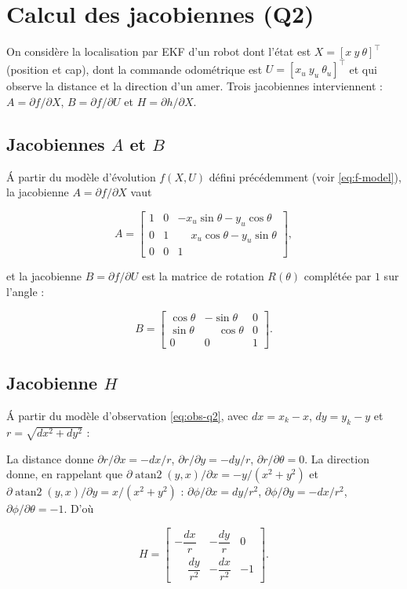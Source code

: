 \documentclass[11pt]{article}
\theoremstyle{remark}
\theoremstyle{definition}
\begin{document}
\section{Calcul des jacobiennes (Q2)}\label{sec:jacobiennes}

On consid\`ere la localisation par EKF d'un robot dont l'\'etat est
$X = [x\ y\ \theta]^\top$ (position et cap), dont la commande odom\'etrique est
$U = [x_u\ y_u\ \theta_u]^\top$ et qui observe la distance et la direction d'un amer. Trois
jacobiennes interviennent : $A = \partial f/\partial X$, $B = \partial f/\partial U$ et
$H = \partial h/\partial X$.

\subsection{Jacobiennes $A$ et $B$}

\'A partir du mod\`ele d'\'evolution $f(X,U)$ d\'efini pr\'ec\'edemment (voir
\eqref{eq:f-model}), la jacobienne $A = \partial f/\partial X$ vaut

\begin{equation}
A =
\begin{bmatrix}
1 & 0 & -x_u\sin\theta - y_u\cos\theta \\[2pt]
0 & 1 & \phantom{-}x_u\cos\theta - y_u\sin\theta \\[2pt]
0 & 0 & 1
\end{bmatrix},
\label{eq:A}
\end{equation}

et la jacobienne $B = \partial f/\partial U$ est la matrice de rotation $R(\theta)$ compl\'et\'ee
par $1$ sur l'angle :

\begin{equation}
B =
\begin{bmatrix}
\cos\theta & -\sin\theta & 0 \\[2pt]
\sin\theta & \phantom{-}\cos\theta & 0 \\[2pt]
0 & 0 & 1
\end{bmatrix}.
\label{eq:B}
\end{equation}

\subsection{Jacobienne $H$}

\'A partir du mod\`ele d'observation \eqref{eq:obs-q2}, avec $dx = x_k - x$, $dy = y_k - y$ et
$r = \sqrt{dx^2 + dy^2}$ :

La distance donne $\partial r/\partial x = -dx/r$, $\partial r/\partial y = -dy/r$,
$\partial r/\partial\theta = 0$. La direction donne, en rappelant que
$\partial\operatorname{atan2}(y,x)/\partial x = -y/(x^2+y^2)$ et
$\partial\operatorname{atan2}(y,x)/\partial y = x/(x^2+y^2)$ :
$\partial\phi/\partial x = dy/r^2$, $\partial\phi/\partial y = -dx/r^2$,
$\partial\phi/\partial\theta = -1$. D'o\`u

\begin{equation}
H =
\begin{bmatrix}
-\dfrac{dx}{r} & -\dfrac{dy}{r} & 0 \\[8pt]
\phantom{-}\dfrac{dy}{r^2} & -\dfrac{dx}{r^2} & -1
\end{bmatrix}.
\label{eq:H}
\end{equation}
\end{document}
